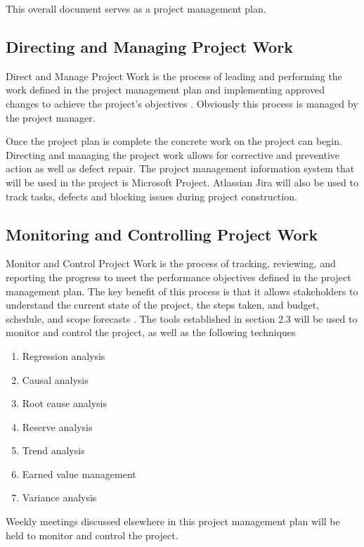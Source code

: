 This overall document serves as a project management plan.

\subsection{Directing and Managing Project Work}

Direct and Manage Project Work is the process of leading and performing the work defined in the project management plan and implementing approved changes to achieve the project’s objectives \parencite{pmbok}. Obviously this process is managed by the project manager.

Once the project plan is complete the concrete work on the project can begin. Directing and managing the project work allows for corrective and preventive action as well as defect repair. The project management information system that will be used in the project is Microsoft Project. Atlassian Jira will also be used to track tasks, defects and blocking issues during project construction.

\subsection{Monitoring and Controlling Project Work}

Monitor and Control Project Work is the process of tracking, reviewing, and reporting the progress to meet the performance objectives defined in the project management plan. The key benefit of this process is that it allows stakeholders to understand the current state of the project, the steps taken, and budget, schedule, and scope forecasts \parencite{pmbok}. The tools established in section 2.3 will be used to monitor and control the project, as well as the following techniques

\begin{enumerate}
\item Regression analysis
\item Causal analysis
\item Root cause analysis
\item Reserve analysis
\item Trend analysis
\item Earned value management
\item Variance analysis
\end{enumerate}

Weekly meetings discussed elsewhere in this project management plan will be held to monitor and control the project.

